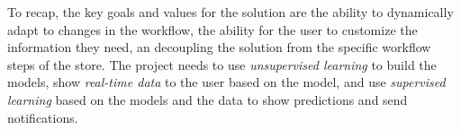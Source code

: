 
To recap, the key goals and values for the solution are the ability to dynamically adapt to changes in the workflow,
the ability for the user to customize the information they need, an decoupling the solution from the specific 
workflow steps of the store. The project needs to use \emph{unsupervised learning} to build the models, show \emph{real-time data} to the user based on the model, and use \emph{supervised learning} based on the models and the data to show predictions and send notifications.

